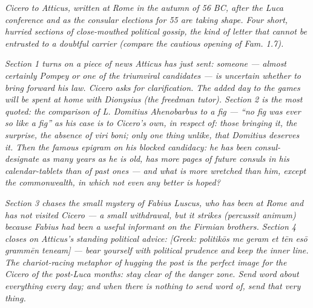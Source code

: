 
\textit{Cicero to Atticus, written at Rome in the autumn of
56 BC, after the Luca conference and as the consular
elections for 55 are taking shape. Four short, hurried
sections of close-mouthed political gossip, the kind of
letter that cannot be entrusted to a doubtful carrier (compare
the cautious opening of \textit{Fam.} 1.7).}

\textit{Section 1 turns on a piece of news Atticus has just
sent: someone --- almost certainly Pompey or one of the
triumviral candidates --- is uncertain whether to bring forward
his law. Cicero asks for clarification. The added day to the
games will be spent at home with Dionysius (the freedman tutor).
Section 2 is the most quoted: the comparison of L. Domitius
Ahenobarbus to a fig --- ``no fig was ever so like a fig'' as
his case is to Cicero's own, in respect of: those bringing it,
the surprise, the absence of \textit{viri boni}; only one thing
unlike, that Domitius deserves it. Then the famous epigram on
his blocked candidacy: he has been consul-designate as many
years as he is old, has more pages of future consuls in his
calendar-tablets than of past ones --- and what is more wretched
than him, except the commonwealth, in which not even any better
is hoped?}

\textit{Section 3 chases the small mystery of Fabius Luscus,
who has been at Rome and has not visited Cicero --- a small
withdrawal, but it strikes (\textit{percussit animum}) because
Fabius had been a useful informant on the Firmian brothers.
Section 4 closes on Atticus's standing political advice:
\textit{[Greek: politik\=os me geram et t\=en es\=o
gramm\=en teneam]} --- bear yourself with political prudence
and keep the inner line. The chariot-racing metaphor of
hugging the post is the perfect image for the Cicero of the
post-Luca months: stay clear of the danger zone. Send word
about everything every day; and when there is nothing to send
word of, send that very thing.}
